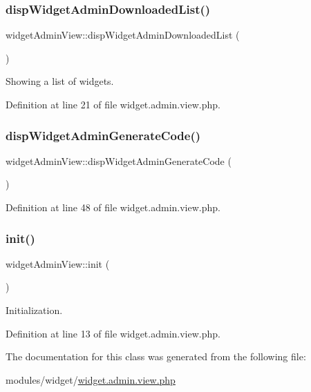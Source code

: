 \subsubsection{\texorpdfstring{disp\+Widget\+Admin\+Downloaded\+List()}{dispWidgetAdminDownloadedList()}}
{\footnotesize\ttfamily widget\+Admin\+View\+::disp\+Widget\+Admin\+Downloaded\+List (\begin{DoxyParamCaption}{ }\end{DoxyParamCaption})}



Showing a list of widgets. 



Definition at line 21 of file widget.\+admin.\+view.\+php.

\mbox{\label{classwidgetAdminView_ad7ff38d629f723021518ac9ec7a88933}} 
\subsubsection{\texorpdfstring{disp\+Widget\+Admin\+Generate\+Code()}{dispWidgetAdminGenerateCode()}}
{\footnotesize\ttfamily widget\+Admin\+View\+::disp\+Widget\+Admin\+Generate\+Code (\begin{DoxyParamCaption}{ }\end{DoxyParamCaption})}



Definition at line 48 of file widget.\+admin.\+view.\+php.

\mbox{\label{classwidgetAdminView_a6445179410099d3fa2b13a8e080d805b}} 
\subsubsection{\texorpdfstring{init()}{init()}}
{\footnotesize\ttfamily widget\+Admin\+View\+::init (\begin{DoxyParamCaption}{ }\end{DoxyParamCaption})}



Initialization. 



Definition at line 13 of file widget.\+admin.\+view.\+php.



The documentation for this class was generated from the following file\+:\begin{DoxyCompactItemize}
\item 
modules/widget/\hyperlink{widget_8admin_8view_8php}{widget.\+admin.\+view.\+php}\end{DoxyCompactItemize}
